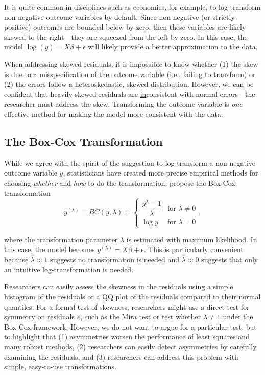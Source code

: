 \documentclass[12pt]{article}
\begin{document}
It is quite common in disciplines such as economics, for example, to log-transform non-negative outcome variables by default. 
Since non-negative (or strictly positive) outcomes are bounded below by zero, then these variables are likely skewed to the right---they are squeezed from the left by zero. 
In this case, the model $\log(y) = X\beta + \epsilon$ will likely provide a better approximation to the data.

When addressing skewed residuals, it is impossible to know whether (1) the skew is due to a misspecification of the outcome variable (i.e., failing to transform) or (2) the errors follow a heteroskedastic, skewed distribution. 
However, we can be confident that heavily skewed residuals are \underline{in}consistent with normal errors---the researcher must address the skew.
Transforming the outcome variable is \textit{one} effective method for making the model more consistent with the data.

\subsection*{The Box-Cox Transformation}

While we agree with the spirit of the suggestion to log-transform a non-negative outcome variable $y$, statisticians have created more precise empirical methods for choosing \textit{whether} and \textit{how} to do the transformation. 
\cite{BoxCox1964} propose the Box-Cox transformation 
\begin{equation}
   y^{(\lambda)} = BC(y, \lambda) =  \begin{cases}
    \dfrac{y^\lambda - 1}{\lambda} & \text{for } \lambda \neq 0\\
    \log y & \text{for } \lambda = 0
  \end{cases},
\end{equation}

\noindent where the transformation parameter $\lambda$ is estimated with maximum likelihood. 
In this case, the model becomes $y^{(\lambda)} = X\beta + \epsilon$. 
This is particularly convenient because $\hat{\lambda} \approx 1$ suggests no transformation is needed and $\hat{\lambda} \approx 0$ suggests that only an intuitive log-transformation is needed.

Researchers can easily assess the skewness in the residuals using a simple histogram of the residuals or a QQ plot of the residuals compared to their normal quantiles. 
For a formal test of skewness, researchers might use a direct test for symmetry on residuals $\hat{e}$, such as the Mira test \citep{Mira1999} or test whether $\lambda \neq 1$ under the Box-Cox framework. 
However, we do not want to argue for a particular test, but to highlight that (1) asymmetries worsen the performance of least squares and many robust methods, (2) researchers can easily detect asymmetries by carefully examining the residuals, and (3) researchers can address this problem with simple, easy-to-use transformations.
\end{document}
